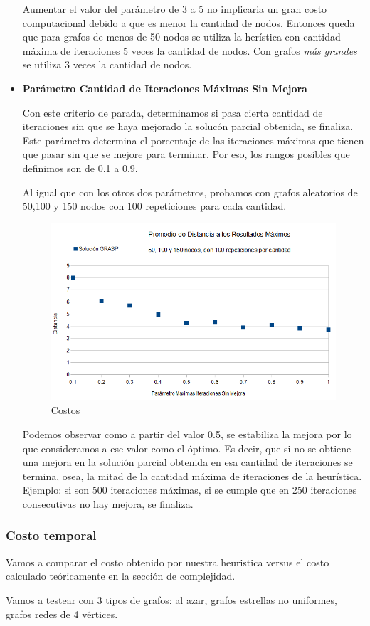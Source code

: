 \begin{itemize}
\quad Aumentar el valor del parámetro de 3 a 5 no implicaria un gran costo computacional debido a que es menor la cantidad de nodos. Entonces queda que para grafos de menos de 50 nodos se utiliza la herística con cantidad máxima de iteraciones 5 veces la cantidad de nodos. Con grafos \textit{más grandes} se utiliza 3 veces la cantidad de nodos.

\item \textbf{Parámetro Cantidad de Iteraciones Máximas Sin Mejora}

\quad

\quad Con este criterio de parada, determinamos si pasa cierta cantidad de iteraciones sin que se haya mejorado la solucón parcial obtenida, se finaliza. Este parámetro determina el porcentaje de las iteraciones máximas que tienen que pasar sin que se mejore para terminar. Por eso, los rangos posibles que definimos son de 0.1 a 0.9.

\quad Al igual que con los otros dos parámetros, probamos con grafos aleatorios de 50,100 y 150 nodos con 100 repeticiones para cada cantidad.

\begin{figure}[H]
	\centering
	\includegraphics[scale=0.6]{optimizacionGRASPParIterMaxSinMejora.png}
\caption{Costos}
\end{figure}

\quad Podemos observar como a partir del valor 0.5, se estabiliza la mejora por lo que consideramos a ese valor como el óptimo. Es decir, que si no se obtiene una mejora en la solución parcial obtenida en esa cantidad de iteraciones se termina, osea, la mitad de la cantidad máxima de iteraciones de la heurística. Ejemplo: si son 500 iteraciones máximas, si se cumple que en 250 iteraciones consecutivas no hay mejora, se finaliza.

\end{itemize}

\subsubsection{Costo temporal}

\quad Vamos a comparar el costo obtenido por nuestra heuristica versus el costo calculado teóricamente en la sección de complejidad.

\quad Vamos a testear con 3 tipos de grafos: al azar, grafos estrellas no uniformes, grafos redes de 4 vértices.